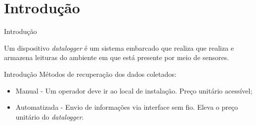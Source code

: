\section{Introdução}
\begin{frame}{Introdução}
    
    Um dispositivo \textit{datalogger} é um sistema embarcado que realiza que realiza e armazena leituras do ambiente em que está presente por meio de sensores.

    

    


\end{frame}

\begin{frame}{Introdução}
    Métodos de recuperação dos dados coletados: 
    
    \begin{itemize}
        \item Manual - Um operador deve ir ao local de instalação. Preço unitário acessível;  
        \item Automatizada - Envio de informações via interface sem fio. Eleva o preço unitário do \textit{datalogger}.
    \end{itemize}

\end{frame}






